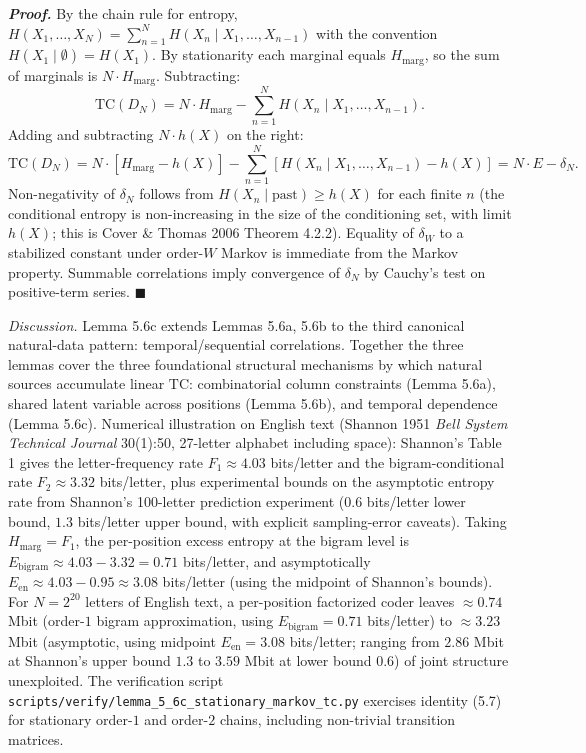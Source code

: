 \documentclass[
]{article}
\begin{document}
\emph{\textbf{Proof.}} By the chain rule for entropy,
$H(X_1, \ldots, X_N) = \sum_{n=1}^N H(X_n \mid X_1, \ldots, X_{n-1})$
with the convention $H(X_1 \mid \emptyset) = H(X_1)$. By
stationarity each marginal equals $H_{\mathrm{marg}}$, so the sum
of marginals is $N \cdot H_{\mathrm{marg}}$. Subtracting:
\[
\mathrm{TC}(D_N) = N \cdot H_{\mathrm{marg}} - \sum_{n=1}^N H(X_n \mid X_1, \ldots, X_{n-1}).
\]
Adding and subtracting $N \cdot h(X)$ on the right:
\[
\mathrm{TC}(D_N) = N \cdot [H_{\mathrm{marg}} - h(X)] - \sum_{n=1}^N [H(X_n \mid X_1, \ldots, X_{n-1}) - h(X)]
                 = N \cdot E - \delta_N.
\]
Non-negativity of $\delta_N$ follows from $H(X_n \mid \mathrm{past})
\geq h(X)$ for each finite $n$ (the conditional entropy is
non-increasing in the size of the conditioning set, with limit
$h(X)$; this is Cover \& Thomas 2006 Theorem 4.2.2). Equality of
$\delta_W$ to a stabilized constant under order-$W$ Markov is
immediate from the Markov property. Summable correlations imply
convergence of $\delta_N$ by Cauchy's test on positive-term series.
\hfill$\blacksquare$

\emph{Discussion.} Lemma 5.6c extends Lemmas 5.6a, 5.6b to the third
canonical natural-data pattern: temporal/sequential correlations.
Together the three lemmas cover the three foundational structural
mechanisms by which natural sources accumulate linear
$\mathrm{TC}$: combinatorial column constraints (Lemma 5.6a),
shared latent variable across positions (Lemma 5.6b), and temporal
dependence (Lemma 5.6c). Numerical illustration on English text (Shannon 1951
\emph{Bell System Technical Journal} 30(1):50, 27-letter alphabet
including space): Shannon's Table 1 gives the letter-frequency rate
$F_1 \approx 4.03$ bits/letter and the bigram-conditional rate
$F_2 \approx 3.32$ bits/letter, plus experimental bounds on the
asymptotic entropy rate from Shannon's 100-letter prediction
experiment ($0.6$ bits/letter lower bound, $1.3$ bits/letter upper
bound, with explicit sampling-error caveats). Taking
$H_{\mathrm{marg}} = F_1$, the per-position excess entropy at the
bigram level is
$E_{\mathrm{bigram}} \approx 4.03 - 3.32 = 0.71$ bits/letter, and
asymptotically $E_{\mathrm{en}} \approx 4.03 - 0.95 \approx 3.08$
bits/letter (using the midpoint of Shannon's bounds). For
$N = 2^{20}$ letters of English text, a per-position factorized
coder leaves $\approx 0.74$ Mbit (order-$1$ bigram approximation,
using $E_{\mathrm{bigram}} = 0.71$ bits/letter) to $\approx 3.23$
Mbit (asymptotic, using midpoint $E_{\mathrm{en}} = 3.08$
bits/letter; ranging from $2.86$ Mbit at Shannon's upper bound
$1.3$ to $3.59$ Mbit at lower bound $0.6$) of joint structure
unexploited. The
verification script
\texttt{scripts/verify/lemma\_5\_6c\_stationary\_markov\_tc.py}
exercises identity (5.7) for stationary order-$1$ and order-$2$
chains, including non-trivial transition matrices.
\end{document}
